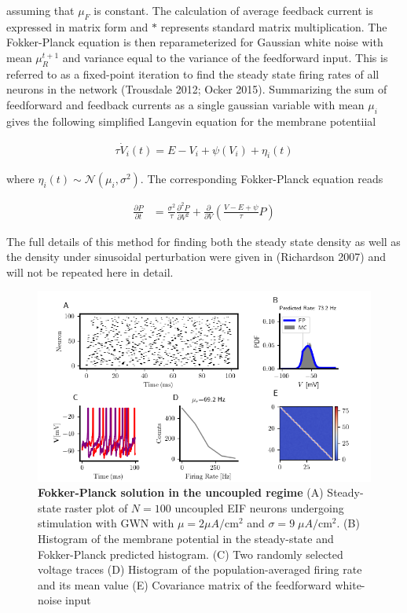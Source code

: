 \documentclass{ucetd}
\begin{document}
assuming that $\mu_{F}$ is constant. The calculation of average feedback current is expressed in matrix form and $*$ represents standard matrix multiplication. The Fokker-Planck equation is then reparameterized for Gaussian white noise with mean $\mu_{R}^{t+1}$ and variance equal to the variance of the feedforward input. This is referred to as a fixed-point iteration to find the steady state firing rates of all neurons in the network (Trousdale 2012; Ocker 2015). Summarizing the sum of feedforward and feedback currents as a single gaussian variable with mean $\mu_{i}$ gives the following simplified Langevin equation for the membrane potentiial

\begin{align}
\tau\dot{V}_{i}(t) = E - V_{i} + \psi(V_{i}) + \eta_{i}(t)
\end{align}

where $\eta_{i}(t) \sim \mathcal{N}(\mu_{i},\sigma^{2})$. The corresponding Fokker-Planck equation reads

\begin{align}
\frac{\partial P}{\partial t} &= \frac{\sigma^{2}}{\tau}\frac{\partial^{2}P}{\partial V^{2}} + \frac{\partial}{\partial V}\left(\frac{V-E+\psi}{\tau}P\right)
\end{align}

The full details of this method for finding both the steady state density as well as the density under sinusoidal perturbation were given in (Richardson 2007) and will not be repeated here in detail.

\begin{figure}[t!]
\centering
\includegraphics[width=175mm]{figure-3}
\caption{\textbf{Fokker-Planck solution in the uncoupled regime} (A) Steady-state raster plot of $N=100$ uncoupled EIF neurons undergoing stimulation with GWN with $\mu = 2\mu A/\mathrm{cm}^{2}$ and $\sigma = 9 \;\mu A/\mathrm{cm}^{2}$. (B) Histogram of the membrane potential in the steady-state and Fokker-Planck predicted histogram. (C) Two randomly selected voltage traces (D) Histogram of the population-averaged firing rate and its mean value (E) Covariance matrix of the feedforward white-noise input}
\end{figure}
\end{document}
